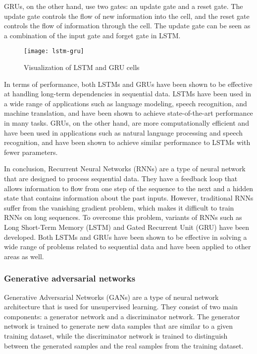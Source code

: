 GRUs, on the other hand, use two gates: an update gate and a reset gate.
The update gate controls the flow of new information into the cell, and the reset gate controls the flow of information through the cell.
The update gate can be seen as a combination of the input gate and forget gate in LSTM.

\begin{figure}[!htbp]
  \centering
  \texttt{[image: lstm-gru]}
  \caption{Visualization of LSTM and GRU cells \cite{phi}}
\end{figure}

In terms of performance, both LSTMs and GRUs have been shown to be effective at handling long-term dependencies in sequential data.
LSTMs have been used in a wide range of applications such as language modeling, speech recognition, and machine translation, and have been shown to achieve state-of-the-art performance in many tasks.
GRUs, on the other hand, are more computationally efficient and have been used in applications such as natural language processing and speech recognition, and have been shown to achieve similar performance to LSTMs with fewer parameters.

In conclusion, Recurrent Neural Networks (RNNs) are a type of neural network that are designed to process sequential data.
They have a feedback loop that allows information to flow from one step of the sequence to the next and a hidden state that contains information about the past inputs.
However, traditional RNNs suffer from the vanishing gradient problem, which makes it difficult to train RNNs on long sequences.
To overcome this problem, variants of RNNs such as Long Short-Term Memory (LSTM) and Gated Recurrent Unit (GRU) have been developed. Both LSTMs and GRUs have been shown to be effective in solving a wide range of problems related to sequential data and have been applied to other areas as well.

\subsubsection{Generative adversarial networks}
Generative Adversarial Networks (GANs) are a type of neural network architecture that is used for unsupervised learning.
They consist of two main components: a generator network and a discriminator network.
The generator network is trained to generate new data samples that are similar to a given training dataset, while the discriminator network is trained to distinguish between the generated samples and the real samples from the training dataset.

